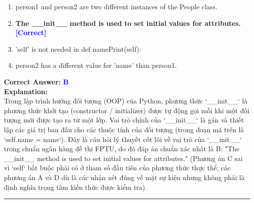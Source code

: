 \documentclass[11pt,a4paper]{article}
\begin{document}
\begin{minipage}{\textwidth}
\begin{enumerate}[label=\Alph*.]
    \item person1 and person2 are two different instances of the People class.
    \item \textbf{The __init__ method is used to set initial values for attributes.} \hfill \textcolor{blue}{\textbf{[Correct]}}
    \item 'self' is not needed in def namePrint(self):
    \item person2 has a different value for 'name' than person1.
\end{enumerate}

\noindent \textbf{Correct Answer:} \textcolor{blue}{\textbf{B}} \\[4pt]
\noindent \textbf{Explanation:}\\
Trong lập trình hướng đối tượng (OOP) của Python, phương thức `__init__` là phương thức khởi tạo (constructor / initializer) được tự động gọi mỗi khi một đối tượng mới được tạo ra từ một lớp. Vai trò chính của `__init__` là gán và thiết lập các giá trị ban đầu cho các thuộc tính của đối tượng (trong đoạn mã trên là `self.name = name`).\newline
Đây là câu hỏi lý thuyết cốt lõi về vai trò của `__init__` trong chuẩn ngân hàng đề thi FPTU, do đó đáp án chuẩn xác nhất là B: "The __init__ method is used to set initial values for attributes."\newline
(Phương án C sai vì `self` bắt buộc phải có ở tham số đầu tiên của phương thức thực thể; các phương án A và D dù là các nhận xét đúng về mặt sự kiện nhưng không phải là định nghĩa trọng tâm kiến thức được kiểm tra).
\end{minipage}
\vspace{0.8cm}
\hrule
\vspace{0.5cm}
\end{document}
